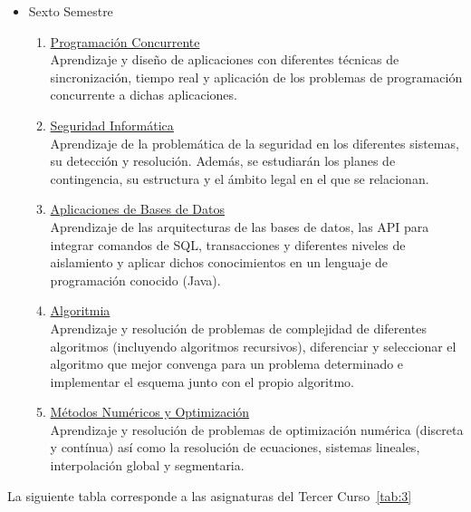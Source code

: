\begin{itemize}
\item Sexto Semestre
\begin{enumerate}[resume]
\item \underline{Programación Concurrente}\\Aprendizaje y diseño de aplicaciones  con diferentes técnicas de sincronización, tiempo real y aplicación de los problemas de programación concurrente a dichas aplicaciones. 
\item \underline{Seguridad Informática}\\Aprendizaje de la problemática de  la seguridad en los diferentes sistemas, su detección y  resolución. Además, se estudiarán los planes de contingencia, su estructura y el ámbito legal en el que se relacionan. 
\item \underline{Aplicaciones de Bases de Datos}\\Aprendizaje de las arquitecturas de las bases de datos, las API para integrar comandos de SQL, transacciones y diferentes niveles de aislamiento y aplicar dichos conocimientos en  un lenguaje de programación conocido (Java).
\item \underline{Algoritmia}\\Aprendizaje y resolución de problemas de complejidad de diferentes algoritmos (incluyendo algoritmos recursivos), diferenciar y seleccionar el algoritmo que mejor convenga para un problema determinado e implementar el esquema junto con el propio algoritmo. 
\item \underline{Métodos Numéricos y Optimización}\\Aprendizaje y resolución de problemas de optimización numérica (discreta y contínua) así como la resolución de ecuaciones, sistemas lineales, interpolación global y segmentaria. 
\end{enumerate}
\end{itemize}
La siguiente tabla corresponde a las asignaturas del Tercer Curso~\ref{tab:3}
